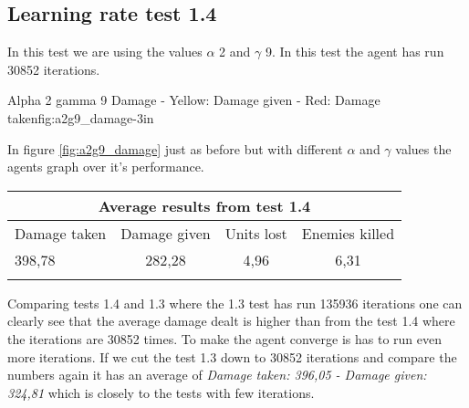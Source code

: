 \subsection*{Learning rate test 1.4}
In this test we are using the values $\alpha$ 2 and $\gamma$ 9. In this test the agent has run 30852 iterations.


			{Alpha 2 gamma 9 Damage - Yellow: Damage given - Red: Damage taken}{fig:a2g9_damage}{-3in}

In figure \ref{fig:a2g9_damage} just as before but with different $\alpha$ and $\gamma$ values the agents graph over it's performance.




\begin{centering}
 \begin{tabular}{|l||c|c|c|}
	\multicolumn{4}{c}{Average results from test 1.4} \\
	\hline
		Damage taken & Damage given & Units lost & Enemies killed\\
	\hline
		398,78 & 282,28 & 4,96 & 6,31 \\
	\hline
\label{test1.4}
\end{tabular}
\end{centering}


Comparing tests 1.4 and 1.3 where the 1.3 test has run 135936 iterations one can clearly see that the average damage dealt is higher than from the test 1.4 where the iterations are 30852 times. To make the agent converge is has to run even more iterations. If we cut the test 1.3 down to 30852 iterations and compare the numbers again it has an average of \textit{Damage taken: 396,05 - Damage given: 324,81} which is closely to the tests with few iterations.
